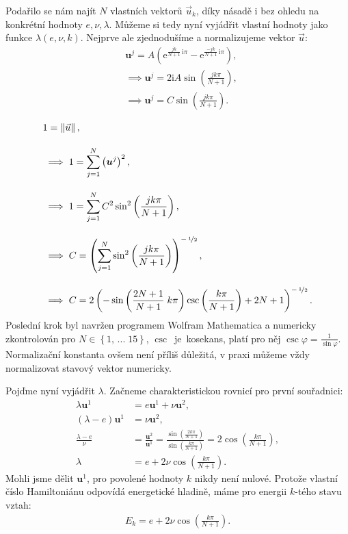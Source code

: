 \documentclass[10pt,a4paper]{article}
\newcommand{\const}[1]{\text{#1}}
\newcommand{\norm}[1]{\left\lVert#1\right\rVert}
\newcommand{\e}[1]{\const{e}^{#1}}
\renewcommand{\i}{\const{i}}
\begin{document}
Podařilo se nám najít $N$ vlastních vektorů $\vec{u}_k$, díky násadě i bez ohledu na konkrétní hodnoty $e, \nu, \lambda$. Můžeme si tedy nyní vyjádřit vlastní hodnoty jako funkce $\lambda(e, \nu, k)$. Nejprve ale zjednodušíme a normalizujeme vektor $\vec{u}$:
\begin{align*}
    &\bm{u}^j = A \left( \e{\tfrac{jk}{N+1}\, \i\pi} - \e{\tfrac{-jk}{N+1}\, \i\pi} \right),
    \\[10pt]
    &\implies \bm{u}^j = 2 \i A \sin \left( \frac{jk\pi}{N+1} \right),
    \\[10pt]
    &\implies \bm{u}^j = C \sin \left( \frac{jk\pi}{N+1} \right).
    \\
\end{align*}
\begin{align*}
    &1 = \norm{ \vec{u} },
    \\[10pt]
    &\implies 1 = \sum_{j=1}^N \left(\bm{u}^j\right)^2,
    \\[10pt]
    &\implies 1 = \sum_{j=1}^N C^2 \sin^2 \left( \frac{jk\pi}{N+1} \right),
    \\[10pt]
    &\implies C = \left( \sum_{j=1}^N \sin^2 \left( \frac{jk\pi}{N+1} \right) \right)^{-\,\nicefrac{1}{2}},
    \\[10pt]
    &\implies C = 2  \left(
        -\sin \left( \frac{ 2N + 1 }{N + 1} \; k \pi \right) \csc \left( \frac{ k \pi }{N + 1} \right) + 2N + 1
    \right)^{-\,\nicefrac{1}{2}}.
\end{align*}
Poslední krok byl navržen programem Wolfram Mathematica a numericky zkontrolován pro $N \in \left\{ 1, \, ... \; 15 \right\}$, $\csc$~je~kosekans, platí pro něj $\csc \varphi = \frac{1}{\sin \varphi}$. Normalizační konstanta ovšem není příliš důležitá, v praxi můžeme vždy normalizovat stavový vektor numericky.

Pojďme nyní vyjádřit $\lambda$. Začneme charakteristickou rovnicí pro první souřadnici:
\begin{align*}
    \lambda \bm{u}^1 &= e \bm{u}^1 + \nu \bm{u}^2,
    \\[10pt]
    \left( \lambda - e \right) \bm{u}^1 &= \nu \bm{u}^2,
    \\[10pt]
    \frac{\lambda - e}{\nu} &= \frac{\bm{u}^2}{\bm{u}^1}
    = \frac{ \sin\left(\frac{2k \pi}{N+1}\right) }{ \sin\left(\frac{k \pi}{N+1}\right) }
    = 2 \cos\left( \frac{k\pi}{N+1} \right),
    \\[10pt]
    \lambda &= e + 2\nu \cos\left( \frac{k\pi}{N+1} \right).
\end{align*}
Mohli jsme dělit $\bm{u}^1$, pro povolené hodnoty $k$ nikdy není nulové. Protože vlastní číslo Hamiltoniánu odpovídá energetické hladině, máme pro energii $k$-tého stavu vztah:
\begin{align*}
    E_k = e + 2 \nu \cos\left(\frac{k\pi}{N+1}\right).
\end{align*}
\end{document}
